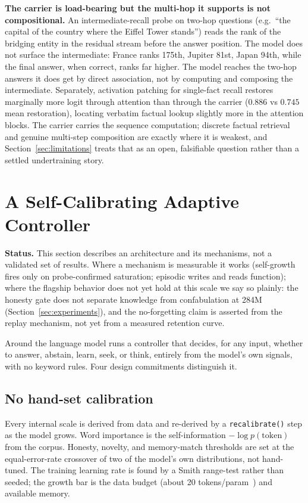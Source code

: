 \documentclass[journal]{IEEEtran}
\newcommand{\code}[1]{\texttt{#1}}
\begin{document}
\textbf{The carrier is load-bearing but the multi-hop it supports is not compositional.} An intermediate-recall probe on two-hop questions (e.g.\ ``the capital of the country where the Eiffel Tower stands'') reads the rank of the bridging entity in the residual stream before the answer position. The model does not surface the intermediate: France ranks 175th, Jupiter 81st, Japan 94th, while the final answer, when correct, ranks far higher. The model reaches the two-hop answers it does get by direct association, not by computing and composing the intermediate. Separately, activation patching for single-fact recall restores marginally more logit through attention than through the carrier ($0.886$ vs $0.745$ mean restoration), locating verbatim factual lookup slightly more in the attention blocks. The carrier carries the sequence computation; discrete factual retrieval and genuine multi-step composition are exactly where it is weakest, and Section~\ref{sec:limitations} treats that as an open, falsifiable question rather than a settled undertraining story.

\section{A Self-Calibrating Adaptive Controller}
\label{sec:controller}
\noindent\textbf{Status.} This section describes an architecture and its mechanisms, not a validated set of results. Where a mechanism is measurable it works (self-growth fires only on probe-confirmed saturation; episodic writes and reads function); where the flagship behavior does not yet hold at this scale we say so plainly: the honesty gate does not separate knowledge from confabulation at 284M (Section~\ref{sec:experiments}), and the no-forgetting claim is asserted from the replay mechanism, not yet from a measured retention curve.

Around the language model runs a controller that decides, for any input, whether to answer, abstain, learn, seek, or think, entirely from the model's own signals, with no keyword rules. Four design commitments distinguish it.

\subsection{No hand-set calibration}
Every internal scale is derived from data and re-derived by a \code{recalibrate()} step as the model grows. Word importance is the self-information $-\log p(\text{token})$ from the corpus. Honesty, novelty, and memory-match thresholds are set at the equal-error-rate crossover of two of the model's own distributions, not hand-tuned. The training learning rate is found by a Smith range-test rather than seeded; the growth bar is the data budget (about 20 tokens/param~\cite{hoffmann2022chinchilla}) and available memory.
\end{document}
